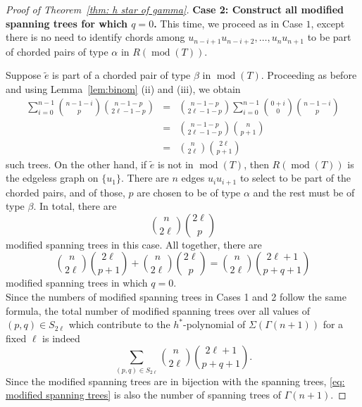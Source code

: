\documentclass{amsart}
\numberwithin{equation}{section}
\theoremstyle{plain}
\theoremstyle{definition}
\DeclareMathOperator{\md}{mod}
\newcommand{\etilde}{\widetilde{e}}
\begin{document}
\begin{proof}[Proof of Theorem~\ref{thm: h star of gamma}]
    \noindent \textbf{Case 2: Construct all modified spanning trees for which $q=0$.}
    This time, we proceed as in Case $1$, except there is no need to identify chords among $u_{n-i+1}u_{n-i+2},\dots,u_nu_{n+1}$ to be part of chorded pairs of type $\alpha$ in $R(\md(T))$.

    Suppose $\etilde$ is part of a chorded pair of type $\beta$ in $\md(T)$.
    Proceeding as before and using Lemma~\ref{lem:binom} (ii) and (iii), we obtain 
    \begin{eqnarray*}       
        \sum_{i=0}^{n-1} \binom{n-1-i}{p}\binom{n-1-p}{2\ell-1-p} &= &
        \binom{n-1-p}{2\ell-1-p} \sum_{i=0}^{n-1} \binom{0+i}{0} \binom{n-1-i}{p}\\
        &=& \binom{n-1-p}{2\ell-1-p} \binom{n}{p+1}\\
        &=& \binom{n}{2\ell}\binom{2\ell}{p+1}
    \end{eqnarray*}
    such trees.
    On the other hand, if $\etilde$ is not in $\md(T)$, then $R(\md(T))$ is the edgeless graph on $\{u_1\}$.
    There are $n$ edges $u_iu_{i+1}$ to select to be part of the chorded pairs, and of those, $p$ are chosen to be of type $\alpha$ and the rest must be of type $\beta$.
    In total, there are 
    \[
        \binom{n}{2\ell}\binom{2\ell}{p}
    \]
    modified spanning trees in this case. 
    All together, there are 
    \[
        \binom{n}{2\ell}\binom{2\ell}{p+1} + \binom{n}{2\ell}\binom{2\ell}{p} = \binom{n}{2\ell}\binom{2\ell+1}{p + q + 1}
    \]
    modified spanning trees in which $q=0$. 
    \\

    Since the numbers of modified spanning trees in Cases 1 and 2 follow the same formula, the total number of modified spanning trees over all values of $(p,q) \in S_{2\ell}$ which contribute to the $h^*$-polynomial of $\Sigma(\Gamma(n+1))$ for a fixed $\ell$ is indeed
    \begin{equation}\label{eq: modified spanning trees}
        \sum_{(p,q) \in S_{2\ell}} \binom{n}{2\ell}\binom{2\ell+1}{p + q + 1}.
    \end{equation}
    Since the modified spanning trees are in bijection with the spanning trees, \eqref{eq: modified spanning trees} is also the number of spanning trees of $\Gamma(n+1)$.
    

\end{proof}
\end{document}
